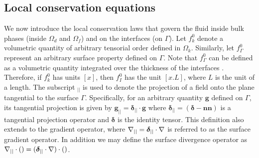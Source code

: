 \subsection{Local conservation equations}
\label{sec:local_eq}
We now introduce the local conservation laws that govern the fluid inside bulk phases (inside $\Omega_d$ and $\Omega_f$) and on the interfaces (on $\Gamma$). 
Let $f_k^0$ denote a volumetric quantity of arbitrary tensorial order defined in $\Omega_k$.
Similarly, let $f_\Gamma^0$ represent an arbitrary surface property defined on $\Gamma$. 
Note that $f_\Gamma^0$ can be defined as a volumetric quantity integrated over the thickness of the interfaces \citet[Chapter 2]{ishii2010thermo}. 
Therefore, if $f_k^0$ has units $[x]$, then $f_I^0$ has the unit $[x.L]$, where $L$ is the unit of a length. 
The subscript $_{||}$ is used to denote the projection of a field onto the plane tangential to the surface $\Gamma$. Specifically, for an arbitrary quantity $\textbf{g}$ defined on $\Gamma$, its tangential projection is given by $\textbf{g}_{||} = \bm\delta_{||}\cdot \textbf{g}$ where $\bm\delta_{||} = (\bm\delta-\textbf{nn})$ is a tangential projection operator and $\bm\delta$ is the identity tensor. 
This definition also extends to the gradient operator, where $\mathbf{\nabla}_{||}= \bm\delta _{||}\cdot \mathbf{\nabla}$ is referred to as the surface gradient operator. In addition we may define the surface divergence operator as $\mathbf{\nabla}_{||} \cdot ()= (\bm\delta _{||}\cdot \mathbf{\nabla})\cdot()$.


